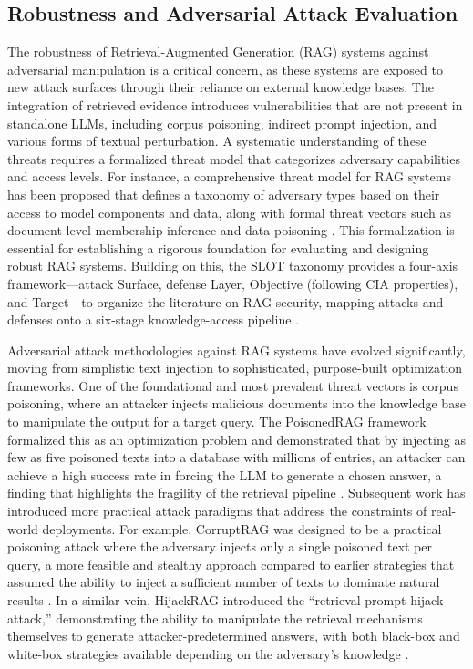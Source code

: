 \documentclass[11pt]{article}
\begin{document}
\subsection{Robustness and Adversarial Attack Evaluation}

The robustness of Retrieval-Augmented Generation (RAG) systems against adversarial manipulation is a critical concern, as these systems are exposed to new attack surfaces through their reliance on external knowledge bases. The integration of retrieved evidence introduces vulnerabilities that are not present in standalone LLMs, including corpus poisoning, indirect prompt injection, and various forms of textual perturbation. A systematic understanding of these threats requires a formalized threat model that categorizes adversary capabilities and access levels. For instance, a comprehensive threat model for RAG systems has been proposed that defines a taxonomy of adversary types based on their access to model components and data, along with formal threat vectors such as document-level membership inference and data poisoning \cite{ref79}. This formalization is essential for establishing a rigorous foundation for evaluating and designing robust RAG systems. Building on this, the SLOT taxonomy provides a four-axis framework---attack Surface, defense Layer, Objective (following CIA properties), and Target---to organize the literature on RAG security, mapping attacks and defenses onto a six-stage knowledge-access pipeline \cite{ref423}.

Adversarial attack methodologies against RAG systems have evolved significantly, moving from simplistic text injection to sophisticated, purpose-built optimization frameworks. One of the foundational and most prevalent threat vectors is corpus poisoning, where an attacker injects malicious documents into the knowledge base to manipulate the output for a target query. The PoisonedRAG framework formalized this as an optimization problem and demonstrated that by injecting as few as five poisoned texts into a database with millions of entries, an attacker can achieve a high success rate in forcing the LLM to generate a chosen answer, a finding that highlights the fragility of the retrieval pipeline \cite{ref424}. Subsequent work has introduced more practical attack paradigms that address the constraints of real-world deployments. For example, CorruptRAG was designed to be a practical poisoning attack where the adversary injects only a single poisoned text per query, a more feasible and stealthy approach compared to earlier strategies that assumed the ability to inject a sufficient number of texts to dominate natural results \cite{ref425}. In a similar vein, HijackRAG introduced the ``retrieval prompt hijack attack,'' demonstrating the ability to manipulate the retrieval mechanisms themselves to generate attacker-predetermined answers, with both black-box and white-box strategies available depending on the adversary's knowledge \cite{ref426}.
\end{document}

